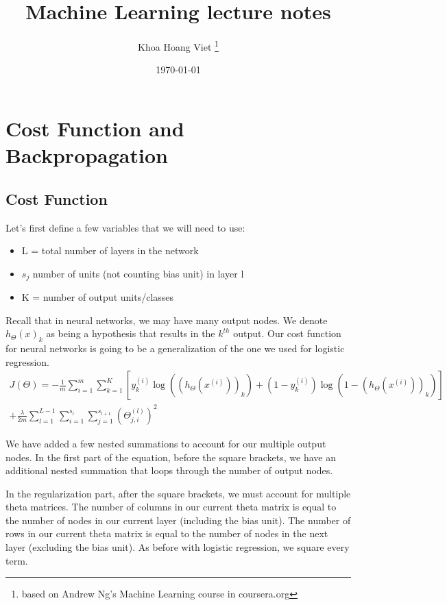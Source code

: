 \documentclass{report}
\title{Machine Learning lecture notes}
\author{Khoa Hoang Viet \thanks{based on Andrew Ng's Machine Learning course in coursera.org}}
\date{\today}
\begin{document}
 
\lstset{style=mystyle}

\section{Cost Function and Backpropagation}
\subsection{Cost Function}
Let's first define a few variables that we will need to use:
\begin{itemize}
  	\item L = total number of layers in the network
  	\item $s_j$ number of units (not counting bias unit) in layer l
  	\item K = number of output units/classes
\end{itemize}

Recall that in neural networks, we may have many output nodes. We denote $h_\Theta(x)_k$  as being a hypothesis that results in the $k^{th}$ output. Our cost function for neural networks is going to be a generalization of the one we used for logistic regression. 
\begin{gather*} 
	J(\Theta) = - \frac{1}{m} \sum_{i=1}^m \sum_{k=1}^K \left[y^{(i)}_k \log ((h_\Theta (x^{(i)}))_k) + (1 - y^{(i)}_k)\log (1 - (h_\Theta(x^{(i)}))_k)\right] \\ 
	+ \frac{\lambda}{2m}\sum_{l=1}^{L-1} \sum_{i=1}^{s_l} \sum_{j=1}^{s_{l+1}} ( \Theta_{j,i}^{(l)})^2
\end{gather*}

We have added a few nested summations to account for our multiple output nodes. In the first part of the equation, before the square brackets, we have an additional nested summation that loops through the number of output nodes.

In the regularization part, after the square brackets, we must account for multiple theta matrices. The number of columns in our current theta matrix is equal to the number of nodes in our current layer (including the bias unit). The number of rows in our current theta matrix is equal to the number of nodes in the next layer (excluding the bias unit). As before with logistic regression, we square every term.
\end{document}
